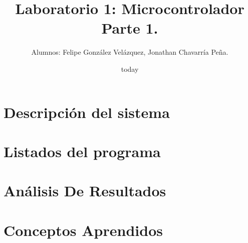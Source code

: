 \documentclass[12pt,letterpapers]{IEEEtran}
\date{today}
\title{Laboratorio 1: Microcontrolador Parte 1.}
\author{Alumnos: Felipe González Velázquez, Jonathan Chavarría Peña.}
\begin{document}
\renewcommand{\leftmark}{UNIVERSIDAD LATINA DE COSTA RICA -- BINGE-57 Arquitectura de Computadores}
\maketitle
	\begin{abstract}

	\end{abstract}
\section{Descripción del sistema}

\section{Listados del programa}

\section{Análisis De Resultados}

\section{Conceptos Aprendidos}  
\end{document}
